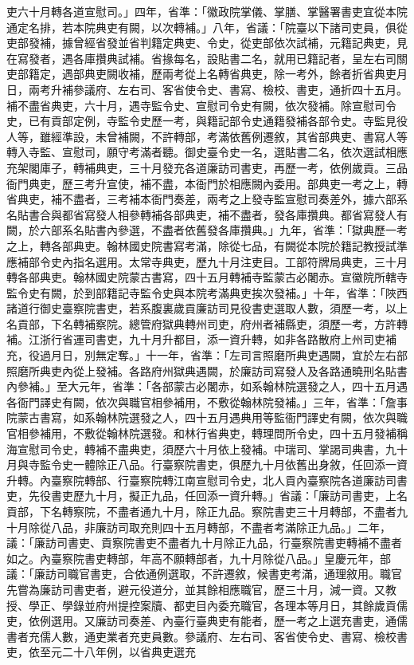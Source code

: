 \begin{pinyinscope}
吏六十月轉各道宣慰司。」四年，省準：「徽政院掌儀、掌膳、掌醫署書吏宜從本院通定名排，若本院典吏有闕，以次轉補。」八年，省議：「院臺以下諸司吏員，俱從吏部發補，據曾經省發並省判籍定典吏、令史，從吏部依次試補，元籍記典吏，見在寫發者，遇各庫攢典試補。省掾每名，設貼書二名，就用已籍記者，呈左右司關吏部籍定，遇部典吏闕收補，歷兩考從上名轉省典吏，除一考外，餘者折省典吏月日，兩考升補參議府、左右司、客省使令史、書寫、檢校、書吏，通折四十五月。補不盡省典吏，六十月，遇寺監令史、宣慰司令史有闕，依次發補。除宣慰司令史，已有貢部定例，寺監令史歷一考，與籍記部令史通籍發補各部令史。寺監見役人等，雖經準設，未曾補闕，不許轉部，考滿依舊例遷敘，其省部典吏、書寫人等轉入寺監、宣慰司，願守考滿者聽。御史臺令史一名，選貼書二名，依次選試相應充架閣庫子，轉補典吏，三十月發充各道廉訪司書吏，再歷一考，依例歲貢。三品衙門典吏，歷三考升宣使，補不盡，本衙門於相應闕內委用。部典吏一考之上，轉省典吏，補不盡者，三考補本衙門奏差，兩考之上發寺監宣慰司奏差外，據六部系名貼書合與都省寫發人相參轉補各部典吏，補不盡者，發各庫攢典。都省寫發人有闕，於六部系名貼書內參選，不盡者依舊發各庫攢典。」九年，省準：「獄典歷一考之上，轉各部典吏。翰林國史院書寫考滿，除從七品，有闕從本院於籍記教授試準應補部令史內指名選用。太常寺典吏，歷九十月注吏目。工部符牌局典吏，三十月轉各部典吏。翰林國史院蒙古書寫，四十五月轉補寺監蒙古必闍赤。宣徽院所轄寺監令史有闕，於到部籍記寺監令史與本院考滿典吏挨次發補。」十年，省準：「陜西諸道行御史臺察院書吏，若系腹裏歲貢廉訪司見役書吏選取人數，須歷一考，以上名貢部，下名轉補察院。總管府獄典轉州司吏，府州者補縣吏，須歷一考，方許轉補。江浙行省運司書吏，九十月升都目，添一資升轉，如非各路散府上州司吏補充，役過月日，別無定奪。」十一年，省準：「左司言照磨所典吏遇闕，宜於左右部照磨所典吏內從上發補。各路府州獄典遇闕，於廉訪司寫發人及各路通曉刑名貼書內參補。」至大元年，省準：「各部蒙古必闍赤，如系翰林院選發之人，四十五月遇各衙門譯史有闕，依次與職官相參補用，不敷從翰林院發補。」三年，省準：「詹事院蒙古書寫，如系翰林院選發之人，四十五月遇典用等監衙門譯史有闕，依次與職官相參補用，不敷從翰林院選發。和林行省典吏，轉理問所令史，四十五月發補稱海宣慰司令史，轉補不盡典吏，須歷六十月依上發補。中瑞司、掌謁司典書，九十月與寺監令史一體除正八品。行臺察院書吏，俱歷九十月依舊出身敘，任回添一資升轉。內臺察院轉部、行臺察院轉江南宣慰司令史，北人貢內臺察院各道廉訪司書吏，先役書吏歷九十月，擬正九品，任回添一資升轉。」省議：「廉訪司書吏，上名貢部，下名轉察院，不盡者通九十月，除正九品。察院書吏三十月轉部，不盡者九十月除從八品，非廉訪司取充則四十五月轉部，不盡者考滿除正九品。」二年，議：「廉訪司書吏、貢察院書吏不盡者九十月除正九品，行臺察院書吏轉補不盡者如之。內臺察院書吏轉部，年高不願轉部者，九十月除從八品。」皇慶元年，部議：「廉訪司職官書吏，合依通例選取，不許遷敘，候書吏考滿，通理敘用。職官先嘗為廉訪司書吏者，避元役道分，並其餘相應職官，歷三十月，減一資。又教授、學正、學錄並府州提控案牘、都吏目內委充職官，各理本等月日，其餘歲貢儒吏，依例選用。又廉訪司奏差、內臺行臺典吏有能者，歷一考之上選充書吏，通儒書者充儒人數，通吏業者充吏員數。參議府、左右司、客省使令史、書寫、檢校書吏，依至元二十八年例，以省典吏選充
\end{pinyinscope}
